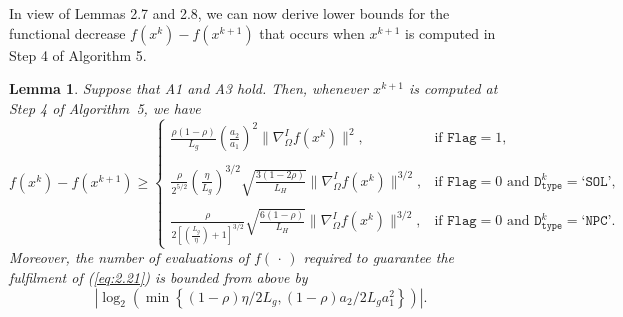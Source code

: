 \documentclass[11pt]{article}
\newtheorem{lemma}[theorem]{Lemma}
\begin{document}
In view of Lemmas 2.7 and 2.8, we can now derive lower bounds for the functional decrease $f(x^{k})-f(x^{k+1})$ that occurs when $x^{k+1}$ is computed in Step 4 of Algorithm 5.

\begin{lemma}
Suppose that A1 and A3 hold. Then, whenever $x^{k+1}$ is computed at Step 4 of Algorithm~5, we have
\small
\setlength{\arraycolsep}{3pt}
\begin{equation}
f(x^{k})-f(x^{k+1})\geq\left\{\begin{array}{ll}
\frac{\rho(1-\rho)}{L_{g}}\left(\frac{a_{2}}{a_{1}}\right)^{2}\|\nabla_{\Omega}^{I}f(x^{k})\|^{2},&\text{if $\texttt{Flag}=1$,}\\
& \\
\frac{\rho}{2^{5/2}}\left(\frac{\eta}{L_{g}}\right)^{3/2}\sqrt{\frac{3(1-2\rho)}{L_{H}}}\|\nabla_{\Omega}^{I}f(x^{k})\|^{3/2},&\text{if $\texttt{Flag}=0$ and $\texttt{D}_{\texttt{type}}^{k}=\texttt{`SOL'}$,}\\
&\\
\frac{\rho}{2\left[\left(\frac{L_{g}}{\eta}\right)+1\right]^{3/2}}\sqrt{\frac{6(1-\rho)}{L_{H}}}\|\nabla_{\Omega}^{I}f(x^{k})\|^{3/2},&\text{if $\texttt{Flag}=0$ and $\texttt{D}_{\texttt{type}}^{k}=\texttt{`NPC'}$.}
\end{array}
\right.
\label{eq:edg1}
\end{equation}
\normalsize
Moreover, the number of evaluations of $f(\,\cdot\,)$ required to guarantee the fulfilment of (\ref{eq:2.21}) is bounded from above by 
$$|\log_{2}\left(\min\left\{(1-\rho)\eta / 2L_{g},(1-\rho)a_{2} / 2L_{g}a_{1}^{2}\right\}\right)|.$$
\label{lem:edg1}
\end{lemma}
\end{document}
